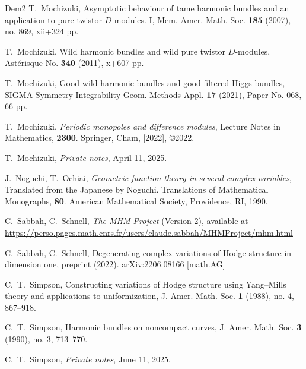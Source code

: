 \documentclass[12pt,twoside]{amsart}
\theoremstyle{definition}
\begin{document}
\begin{thebibliography}{Dem2}
T.~Mochizuki, 
Asymptotic behaviour of tame harmonic 
bundles and an application to pure 
twistor $D$-modules. I, Mem. Amer. Math. Soc. \textbf{185} 
(2007), no. 869, xii+324 pp. 

T.~Mochizuki, 
Wild harmonic bundles and wild pure 
twistor $D$-modules, Ast\'erisque No. \textbf{340} (2011), 
x+607 pp. 

T.~Mochizuki, 
Good wild harmonic bundles and good filtered Higgs bundles, 
SIGMA Symmetry Integrability Geom. Methods Appl. \textbf{17} (2021), Paper No. 068, 66 pp. 

T.~Mochizuki, {\em{Periodic monopoles and difference modules}}, 
Lecture Notes in Mathematics, \textbf{2300}. Springer, Cham, [2022], {\copyright}2022. 

T.~Mochizuki, 
\textit{Private notes}, April 11, 2025.

J.~Noguchi, T.~Ochiai, {\em{Geometric function theory in several complex 
variables}}, Translated from the Japanese by 
Noguchi. Translations of Mathematical 
Monographs, \textbf{80}. American Mathematical Society, Providence, RI, 1990. 

C.~Sabbah, C.~Schnell, 
\textit{The MHM Project} (Version 2), 
available at 
\url{https://perso.pages.math.cnrs.fr/users/claude.sabbah/MHMProject/mhm.html}

C.~Sabbah, C.~Schnell, 
Degenerating complex variations of Hodge structure in dimension one, 
preprint (2022). arXiv:2206.08166 [math.AG]

C.~T.~Simpson, 
Constructing variations of Hodge 
structure using Yang--Mills theory 
and applications to uniformization, 
J. Amer. Math. Soc. \textbf{1} (1988), no. 4, 867--918. 

C.~T.~Simpson, 
Harmonic bundles on noncompact 
curves, J. Amer. Math. Soc. \textbf{3} (1990), no. 3, 713--770.

C.~T.~Simpson, 
\textit{Private notes}, June 11, 2025.

\end{thebibliography}
\end{document}
